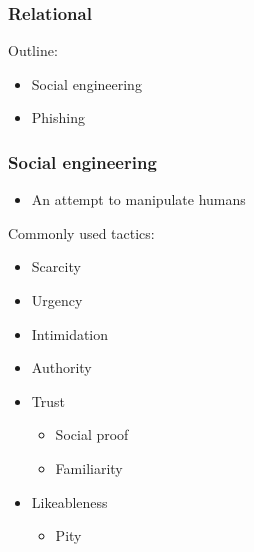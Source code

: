 \documentclass[blue]{beamer}
\begin{document}
\begin{frame}
\frametitle{Relational}

\begin{block}{Outline:}
\begin{itemize}
  \item Social engineering
  \item Phishing
\end{itemize}
\end{block}

\end{frame}



\begin{frame}
\frametitle{Social engineering}

\begin{itemize}
  \item An attempt to manipulate humans
\end{itemize}

\begin{block}{Commonly used tactics:}
\begin{itemize}
  \item Scarcity
  \item Urgency
  \item Intimidation
  \item Authority
  \item Trust
  \begin{itemize}
    \item Social proof
    \item Familiarity
  \end{itemize}
  \item Likeableness
  \begin{itemize}
    \item Pity
  \end{itemize}
\end{itemize}
\end{block}

\end{frame}
\end{document}
